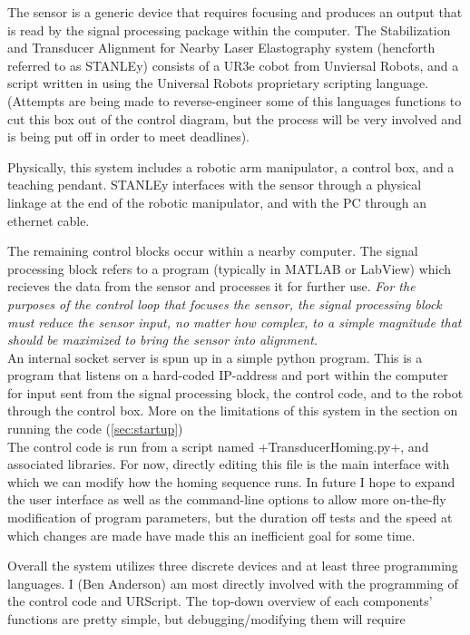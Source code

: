 \documentclass[11pt]{article}
\begin{document}
The sensor is a generic device that requires focusing and produces an output that is read by the signal processing package within the computer. The Stabilization and Transducer Alignment for Nearby Laser Elastography system (hencforth referred to as STANLEy) consists of a UR3e cobot from Unviersal Robots, and a script written in using the Universal Robots proprietary scripting language. \\
(Attempts are being made to reverse-engineer some of this languages functions to cut this box out of the control diagram, but the process will be very involved and is being put off in order to meet deadlines).

Physically, this system includes a robotic arm manipulator, a control box, and a teaching pendant.
STANLEy interfaces with the sensor through a physical linkage at the end of the robotic manipulator, and with the PC through an ethernet cable.

The remaining control blocks occur within a nearby computer. The signal processing block refers to a program (typically in MATLAB or LabView) which recieves the data from the sensor and processes it for further use. 
\emph{For the purposes of the control loop that focuses the sensor, the signal processing block must reduce the sensor input, no matter how complex, to a simple magnitude that should be maximized to bring the sensor into alignment.}\\
An internal socket server is spun up in a simple python program. This is a program that listens on a hard-coded IP-address and port within the computer for input sent from the signal processing block, the control code, and to the robot through the control box. More on the limitations of this system in the section on running the code (\autoref{sec:startup})\\
The control code is run from a script named +TransducerHoming.py+, and associated libraries. For now, directly editing this file is the main interface with which we can modify how the homing sequence runs.
In future I hope to expand the user interface as well as the command-line options to allow more on-the-fly modification of program parameters, but the duration off tests and the speed at which changes are made have made this an inefficient goal for some time.

Overall the system utilizes three discrete devices and at least three programming languages. I (Ben Anderson) am most directly involved with the programming of the control code and URScript. The top-down overview of each components' functions are pretty simple, but debugging/modifying them will require
\end{document}
